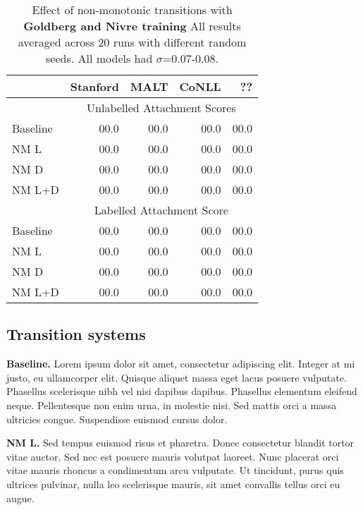 \documentclass[11pt,letterpaper]{article}
\begin{document}
\begin{table}[t]
    \small
    \centering
    \begin{tabular}{l|rrrr}
        \hline
                              & Stanford & MALT & CoNLL & ?? \\
        \hline \hline
                              & \multicolumn{4}{c}{Unlabelled Attachment Scores} \\
        \hline
        Baseline              &  00.0  & 00.0 & 00.0 & 00.0   \\
        NM L                  &  00.0  & 00.0 & 00.0 & 00.0   \\
        NM D                  &  00.0  & 00.0 & 00.0 & 00.0   \\
        NM L+D                &  00.0  & 00.0 & 00.0 & 00.0    \\ 
        \hline
                              & \multicolumn{4}{c}{Labelled Attachment Score} \\
        \hline
        Baseline              &  00.0  & 00.0 & 00.0  & 00.0   \\
        NM L                  &  00.0  & 00.0 & 00.0  & 00.0   \\
        NM D                  &  00.0  & 00.0 & 00.0  & 00.0   \\
        NM L+D                &  00.0  & 00.0 & 00.0  & 00.0   \\ 
        \hline
    \end{tabular}
    \caption{\small Effect of non-monotonic transitions with \textbf{Goldberg and Nivre training}
            All results averaged across 20 runs with different random seeds. All models
             had $\sigma$=0.07-0.08.\label{tab:goldberg}}
\end{table}

\subsection{Transition systems}

\textbf{Baseline.} Lorem ipsum dolor sit amet, consectetur adipiscing elit. Integer at mi justo, eu ullamcorper elit. Quisque aliquet massa eget lacus posuere vulputate. Phasellus scelerisque nibh vel nisi dapibus dapibus. Phasellus elementum eleifend neque. Pellentesque non enim urna, in molestie nisi. Sed mattis orci a massa ultricies congue. Suspendisse euismod cursus dolor.

\textbf{NM L.} Sed tempus euismod risus et pharetra. Donec consectetur blandit tortor vitae auctor. Sed nec est posuere mauris volutpat laoreet. Nunc placerat orci vitae mauris rhoncus a condimentum arcu vulputate. Ut tincidunt, purus quis ultrices pulvinar, nulla leo scelerisque mauris, sit amet convallis tellus orci eu augue.
\end{document}
